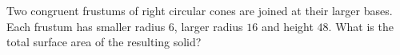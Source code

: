 Two congruent frustums of right circular cones are joined at their larger bases. Each frustum has smaller radius $6$, larger radius $16$ and height $48$. What is the total surface area of the resulting solid?
